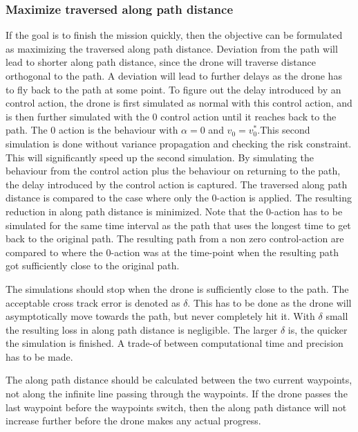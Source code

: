 \subsubsection{Maximize traversed along path distance}
If the goal is to finish the mission quickly, then the objective can be formulated as maximizing the traversed along path distance. Deviation from the path will lead to shorter along path distance, since the drone will traverse distance orthogonal to the path. A deviation will lead to further delays as the drone has to fly back to the path at some point. To figure out the delay introduced by an control action, the drone is first simulated as normal with this control action, and is then further simulated with the 0 control action until it reaches back to the path. The 0 action is the behaviour with $\alpha = 0$ and $v_0 = v_0^*$.This second simulation is done without variance propagation and checking the risk constraint. This will significantly speed up the second simulation. By simulating the behaviour from the control action plus the behaviour on returning to the path, the delay introduced by the control action is captured. The traversed along path distance is compared to the case where only the 0-action is applied. The resulting reduction in along path distance is minimized. Note that the 0-action has to be simulated for the same time interval as the path that uses the longest time to get back to the original path. The resulting path from a non zero control-action are compared to where the 0-action was at the time-point when the resulting path got sufficiently close to the original path. 

The simulations should stop when the drone is sufficiently close to the path. The acceptable cross track error is denoted as $\delta$. This has to be done as the drone will asymptotically move towards the path, but never completely hit it. With $\delta$ small the resulting loss in along path distance is negligible. The larger $\delta$ is, the quicker the simulation is finished. A trade-of between computational time and precision has to be made.

The along path distance should be calculated between the two current waypoints, not along the infinite line passing through the waypoints. If the drone passes the last waypoint before the waypoints switch, then the along path distance will not increase further before the drone makes any actual progress. 

